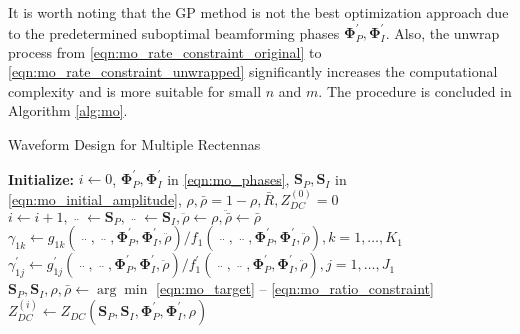 It is worth noting that the GP method is not the best optimization approach due to the predetermined suboptimal beamforming phases ${\mathbf{\Phi }}_P^\prime ,{\mathbf{\Phi }}_I^\prime $. Also, the unwrap process from \eqref{eqn:mo_rate_constraint_original} to \eqref{eqn:mo_rate_constraint_unwrapped} significantly increases the computational complexity and is more suitable for small $n$ and $m$. The procedure is concluded in Algorithm \ref{alg:mo}.

\begin{algorithm}
  \caption{Waveform Design for Multiple Rectennas}
  \label{alg:mo}
  \begin{algorithmic}[1]
    \State \textbf{Initialize:} $i \leftarrow 0$, ${{\mathbf{\Phi }}_P^\prime ,{\mathbf{\Phi }}_I^\prime }$ in \eqref{eqn:mo_phases}, ${{{\mathbf{S}}_P},{{\mathbf{S}}_I}}$ in \eqref{eqn:mo_initial_amplitude}, $\rho ,\bar \rho  = 1 - \rho ,\bar R,Z_{DC}^{(0)} = 0$
    \Repeat
      \State $i \leftarrow i + 1,\mathop {{{\mathbf{S}}_P}}\limits^{..}  \leftarrow {{\mathbf{S}}_P},\mathop {{{\mathbf{S}}_I}}\limits^{..}  \leftarrow {{\mathbf{S}}_I},\ddot \rho  \leftarrow \rho ,\ddot{\bar{\rho}}  \leftarrow \bar \rho $
      \State ${\gamma _{1k}} \leftarrow {g_{1k}}\left( {\mathop {{{\mathbf{S}}_P}}\limits^{..} ,\mathop {{{\mathbf{S}}_I}}\limits^{..} ,{\mathbf{\Phi }}_P^\prime ,{\mathbf{\Phi }}_I^\prime ,\ddot \rho } \right)/{f_1}\left( {\mathop {{{\mathbf{S}}_P}}\limits^{..} ,\mathop {{{\mathbf{S}}_I}}\limits^{..} ,{\mathbf{\Phi }}_P^\prime ,{\mathbf{\Phi }}_I^\prime ,\ddot \rho } \right),k = 1, \ldots ,{K_1}$
      \State $\gamma _{1j}^\prime  \leftarrow g_{1j}^\prime \left( {\mathop {{{\mathbf{S}}_P}}\limits^{..} ,\mathop {{{\mathbf{S}}_I}}\limits^{..} ,{\mathbf{\Phi }}_P^\prime ,{\mathbf{\Phi }}_I^\prime ,\ddot \rho } \right)/f_1^\prime \left( {\mathop {{{\mathbf{S}}_P}}\limits^{..} ,\mathop {{{\mathbf{S}}_I}}\limits^{..} ,{\mathbf{\Phi }}_P^\prime ,{\mathbf{\Phi }}_I^\prime ,\ddot \rho } \right),j = 1, \ldots ,{J_1}$
      \State ${{\mathbf{S}}_P},{{\mathbf{S}}_I},\rho ,\bar \rho  \leftarrow \arg \min $ \eqref{eqn:mo_target} -- \eqref{eqn:mo_ratio_constraint}
      \State $Z_{DC}^{(i)} \leftarrow {Z_{DC}}\left( {{{\mathbf{S}}_P},{{\mathbf{S}}_I},{\mathbf{\Phi }}_P^\prime ,{\mathbf{\Phi }}_I^\prime ,\rho } \right)$
  \end{algorithmic}
\end{algorithm} 